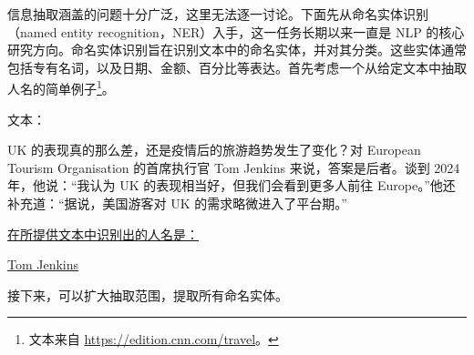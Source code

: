 信息抽取涵盖的问题十分广泛，这里无法逐一讨论。下面先从命名实体识别（named entity recognition，NER）入手，这一任务长期以来一直是 NLP 的核心研究方向。命名实体识别旨在识别文本中的命名实体，并对其分类。这些实体通常包括专有名词，以及日期、金额、百分比等表达。首先考虑一个从给定文本中抽取人名的简单例子\footnote{文本来自 \url{https://edition.cnn.com/travel}。}。

\vspace{0.5em}
\begin{tcolorbox}

\begingroup
\setlength{\leftskip}{2em}
\setlength{\rightskip}{2em}


\vspace{0.7em}

文本：

UK 的表现真的那么差，还是疫情后的旅游趋势发生了变化？对 European Tourism Organisation 的首席执行官 Tom Jenkins 来说，答案是后者。谈到 2024 年，他说：“我认为 UK 的表现相当好，但我们会看到更多人前往 Europe。”他还补充道：“据说，美国游客对 UK 的需求略微进入了平台期。”

\vspace{0.7em}

\underline{在所提供文本中识别出的人名是：}

\vspace{0.3em}

\underline{Tom Jenkins}

\endgroup

\end{tcolorbox}
\vspace{0.5em}

接下来，可以扩大抽取范围，提取所有命名实体。

